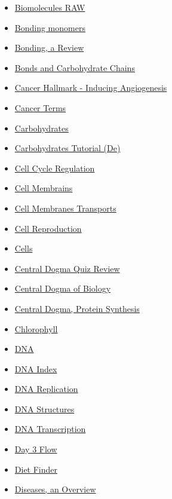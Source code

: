 \documentclass[11pt]{article}
\begin{document}
\begin{itemize}
\begin{itemize}
\item \href{bio101/KBhBIO201BioMoleculesRAW.org}{Biomolecules RAW}
\item \href{bio101/KBe20bio101refBondingMonomers.org}{Bonding monomers}
\item \href{bio101/KBhBIO101BondingReview.org}{Bonding, a Review}
\item \href{bio101/KB20200911095443.org}{Bonds and Carbohydrate Chains}
\item \href{bio101/cancer\_angiogenesis.org}{Cancer Hallmark - Inducing Angiogenesis}
\item \href{bio101/KBrefCancerVocab.org}{Cancer Terms}
\item \href{bio101/KBhBIO101Carbs.org}{Carbohydrates}
\item \href{bio101/KB20200905180226.org}{Carbohydrates Tutorial (De)}
\item \href{bio101/KBhBIO101CellCycleRegulation.org}{Cell Cycle Regulation}
\item \href{bio101/KBhBIO101CellMembraines.org}{Cell Membrains}
\item \href{bio101/KbhBIO101CellTransport.org}{Cell Membranes Transports}
\item \href{bio101/KBhBIO101CellReproduction.org}{Cell Reproduction}
\item \href{bio101/KBhBIO101Cells.org}{Cells}
\item \href{bio101/KBhBIO101CentralDogmaQuizReview.org}{Central Dogma Quiz Review}
\item \href{bio101/KBBIO101CentralDogma.org}{Central Dogma of Biology}
\item \href{bio101/KBhBIO101CentralDogma.org}{Central Dogma, Protein Synthesis}
\item \href{bio101/KBerefChlorophyll.org}{Chlorophyll}
\item \href{bio101/KBe2020bio101refProtienFoldingConflict.org}{DNA}
\item \href{bio101/KBe20bio101refDNA.org}{DNA Index}
\item \href{bio101/KBhBIO101DNAReplication.org}{DNA Replication}
\item \href{bio101/KBhBIO101DNAStructures.org}{DNA Structures}
\item \href{bio101/KBhBIO101DNATranscription.org}{DNA Transcription}
\item \href{bio101/20bio201floD3.org}{Day 3 Flow}
\item \href{bio101/KBe20bio201retDietFinderIndex.org}{Diet Finder}
\item \href{bio101/KBhBIO101Diseases.org}{Diseases, an Overview}

\end{itemize}
\end{itemize}
\end{document}
